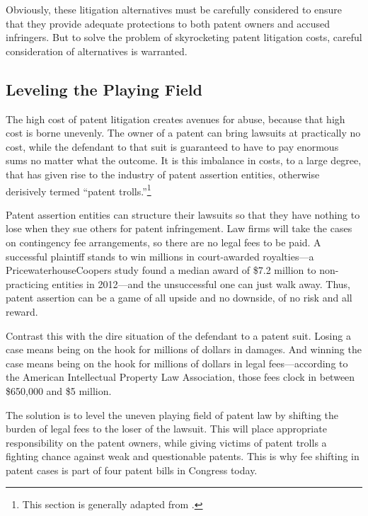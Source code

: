 \documentclass[11pt,twocolumn,titlepage]{article}
\begin{document}
Obviously, these litigation alternatives must be carefully considered to ensure
that they provide adequate protections to both patent owners and accused
infringers. But to solve the problem of skyrocketing patent litigation costs,
careful consideration of alternatives is warranted.

\subsection{Leveling the Playing Field}
\SectionNote

The high cost of patent litigation creates avenues for abuse, because that high
cost is borne unevenly. The owner of a patent can bring lawsuits at practically
no cost, while the defendant to that suit is guaranteed to have to pay enormous
sums no matter what the outcome. It is this imbalance in costs, to a large
degree, that has given rise to the industry of patent assertion entities,
otherwise derisively termed ``patent trolls.''\footnote{This section is
generally adapted from .}

Patent assertion entities can structure their lawsuits so that they  have
nothing to lose when they sue others for patent infringement. Law firms will
take the cases on contingency fee arrangements, so there are no legal fees to be
paid. A successful plaintiff stands to win millions in court-awarded
royalties---a PricewaterhouseCoopers study found a median award of \$7.2 million
to non-practicing entities in 2012---and
the unsuccessful one can just walk away.
Thus, patent assertion can be a game of all upside and no downside, of no risk
and all reward.

Contrast this with the dire situation of the defendant to a patent suit. Losing
a case means being on the hook for millions of dollars in damages. And winning
the case means being on the hook for millions of dollars in legal
fees---according to the American Intellectual Property Law Association, those
fees clock in between \$650,000 and \$5 million.

The solution is to level the uneven playing field of patent law by shifting the
burden of legal fees to the loser of the lawsuit. This will place appropriate
responsibility on the patent owners, while giving victims of patent trolls a
fighting chance against weak and questionable patents. This is why fee shifting
in patent cases is part of four patent bills in Congress today.
\end{document}
